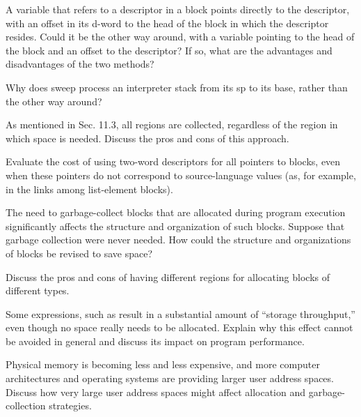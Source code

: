 A variable that refers to a descriptor in a
block points directly to the descriptor, with an offset in its d-word
to the head of the block in which the descriptor resides. Could it be
the other way around, with a variable pointing to the head of the
block and an offset to the descriptor? If so, what are the advantages
and disadvantages of the two methods?

 Why does sweep process an interpreter stack from
its sp to its base, rather than the other way around?

 As mentioned in Sec. 11.3, all regions are
collected, regardless of the region in which space is needed. Discuss
the pros and cons of this approach.

 Evaluate the cost of using two-word descriptors
for all pointers to blocks, even when these pointers do not correspond
to source-language values (as, for example, in the links among
list-element blocks).

 The need to garbage-collect blocks that are
allocated during program execution significantly affects the structure
and organization of such blocks. Suppose that garbage collection were
never needed. How could the structure and organizations of blocks be
revised to save space?

 Discuss the pros and cons of having different
regions for allocating blocks of different types.

 Some expressions, such as
\noindent result in a substantial amount of ``storage
throughput,'' even though no space really needs to be
allocated. Explain why this effect cannot be avoided in general and
discuss its impact on program performance.

 Physical memory is becoming less and less
expensive, and more computer architectures and operating systems are
providing larger user address spaces. Discuss how very large user
address spaces might affect allocation and garbage-collection
strategies.
